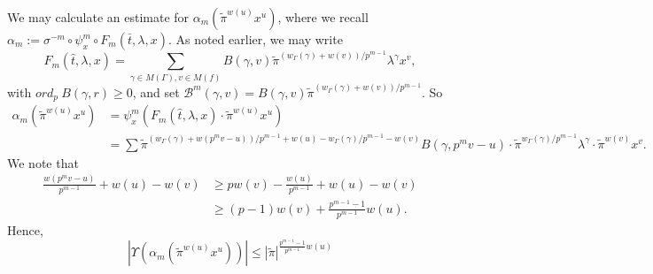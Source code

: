 \documentclass{article}
\theoremstyle{remark}
\begin{document}
We may calculate an estimate for $\alpha_m( \tilde \pi^{w(u)} x^u)$, where we recall $\alpha_m := \sigma^{-m} \circ \psi_x^m \circ F_m(\bar t, \lambda, x)$. As noted earlier, we may write 
\begin{equation}\label{E: splitting}
F_m(\hat t, \lambda, x) = \sum_{\gamma \in M(\Gamma), v \in M(f)} B(\gamma, v) \tilde \pi^{( w_\Gamma(\gamma) + w(v)) / p^{m-1}} \lambda^\gamma x^v,
\end{equation}
with $ord_p \> B(\gamma, r) \geq 0$, and set $\mathcal{B}^m(\gamma,v) =  B(\gamma, v) \tilde \pi^{( w_\Gamma(\gamma) + w(v)) / p^{m-1}} $. So
\begin{align*}
\alpha_m( \tilde \pi^{w(u)} x^u) &= \psi_x^m \left( F_m(\hat t, \lambda, x) \cdot \tilde \pi^{w(u)} x^u \right) \\
&= \sum  \tilde \pi^{(w_\Gamma(\gamma) + w(p^m v - u)) / p^{m-1} + w(u) - w_\Gamma(\gamma)/p^{m-1} - w(v)} B(\gamma, p^m v - u) \cdot \tilde \pi^{w_\Gamma(\gamma) / p^{m-1}} \lambda^\gamma \cdot \tilde \pi^{w(v)} x^v.
\end{align*}
We note that
\begin{align*}
\frac{w(p^m v - u)}{p^{m-1}} + w(u) - w(v) &\geq p w(v) - \frac{w(u)}{p^{m-1}} + w(u) - w(v) \\
&\geq (p-1) w(v) + \frac{p^{m-1}-1}{p^{m-1}} w(u).
\end{align*}
Hence,
\begin{equation}\label{E: upsilon estimate}
| \Upsilon( \alpha_m( \tilde \pi^{w(u)} x^u) ) | \leq | \tilde \pi |^{ \frac{p^{m-1}-1}{p^{m-1}} w(u)}
\end{equation}
\end{document}
